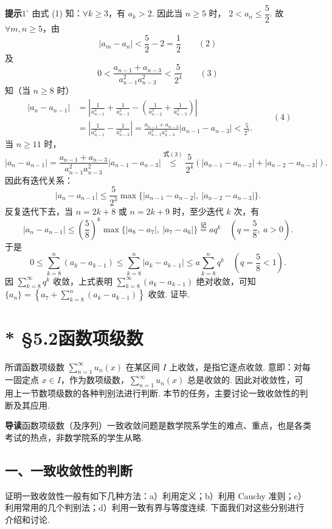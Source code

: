 \documentclass[UTF8, 12pt, fontset=fandol, oneside]{ctexart}
\begin{document}
\noindent\textbf{提示}\quad $1^\circ$ 由式 (1) 知：$\forall k\ge3$，有 $a_k>2$. 因此当 $n\ge5$ 时，
$2<a_n\le\dfrac52$. 故 $\forall m,n\ge5$，由
\[
  |a_m-a_n|<\frac52-2=\frac12
\qquad(2)
\]
及
\[
  0<\frac{a_{n-1}+a_{n-3}}{a_{n-1}^2a_{n-3}^2}<\frac5{2^4}
\qquad(3)
\]
知（当 $n\ge8$ 时）
\begin{equation}
\begin{aligned}
|a_n-a_{n-1}|
&=\left|\frac1{a_{n-1}^2}+\frac1{a_{n-2}^2}
 -\left(\frac1{a_{n-2}^2}+\frac1{a_{n-3}^2}\right)\right|\\
&=\left|\frac1{a_{n-1}^2}-\frac1{a_{n-3}^2}\right|
=\frac{a_{n-1}+a_{n-3}}{a_{n-1}^2a_{n-3}^2}|a_{n-1}-a_{n-3}|
<\frac5{2^5}.
\end{aligned}
\qquad(4)
\end{equation}
当 $n\ge11$ 时，
\[
  |a_n-a_{n-1}|=\frac{a_{n-1}+a_{n-3}}{a_{n-1}^2a_{n-3}^2}|a_{n-1}-a_{n-3}|
  \stackrel{\text{式}(3)}{\le}\frac5{2^4}\left(|a_{n-1}-a_{n-2}|+|a_{n-2}-a_{n-3}|\right).
\]
因此有迭代关系：
\[
  |a_n-a_{n-1}|\le\frac5{2^3}\max\{|a_{n-1}-a_{n-2}|,\ |a_{n-2}-a_{n-3}|\}.
\]
反复迭代下去，当 $n=2k+8$ 或 $n=2k+9$ 时，至少迭代 $k$ 次，有
\[
  |a_n-a_{n-1}|\le\left(\frac58\right)^k
  \max\{|a_8-a_7|,\ |a_7-a_6|\}\stackrel{\text{记}}{=}aq^k
  \quad\left(q=\frac58,\ a>0\right).
\]
于是
\[
  0\le\sum_{k=8}^n(a_k-a_{k-1})
  \le\sum_{k=8}^n|a_k-a_{k-1}|
  \le a\sum_{k=8}^nq^k\quad\left(q=\frac58<1\right).
\]
因 $\sum_{k=8}^{\infty}q^k$ 收敛，上式表明
$\sum_{k=8}^{\infty}(a_k-a_{k-1})$ 绝对收敛，可知
$\{a_n\}=\left\{a_7+\sum_{k=8}^n(a_k-a_{k-1})\right\}$ 收敛. 证毕.

\section*{* §5.2\quad 函数项级数}

所谓函数项级数 $\displaystyle\sum_{n=1}^{\infty}u_n(x)$ 在某区间 $I$ 上收敛，是指它逐点收敛. 意即：对每一固定点
$x\in I$，作为数项级数，$\displaystyle\sum_{n=1}^{\infty}u_n(x)$ 总是收敛的. 因此对收敛性，可用上一节数项级数的各种判别法进行判断. 本节的任务，主要讨论一致收敛性的判断及其应用.

\noindent\textbf{导读}\quad 函数项级数（及序列）一致收敛问题是数学院系学生的难点、重点，也是各类考试的热点，非数学院系的学生从略.

\subsection*{一、一致收敛性的判断}

证明一致收敛性一般有如下几种方法：a）利用定义；b）利用 Cauchy 准则；c）利用常用的几个判别法；d）利用一致有界与等度连续. 下面我们对这些分别进行介绍和讨论.
\end{document}
